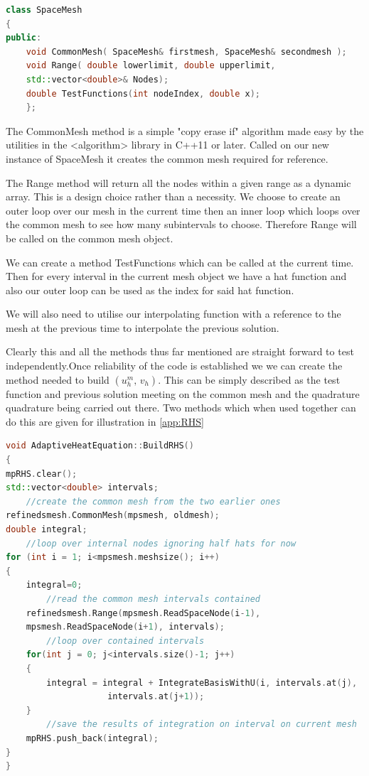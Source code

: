\documentclass{uonmathreport}
\theoremstyle{definition}
\theoremstyle{problem}
\theoremstyle{theorem}
\begin{document}
\begin{lstlisting}[language=C++]
class SpaceMesh
{
public:
    void CommonMesh( SpaceMesh& firstmesh, SpaceMesh& secondmesh );
    void Range( double lowerlimit, double upperlimit, 
    std::vector<double>& Nodes);
    double TestFunctions(int nodeIndex, double x);
    };
\end{lstlisting}

The CommonMesh method is a simple "copy erase if" algorithm made easy by the utilities in the <algorithm> library in C++11 or later. Called on our new instance of SpaceMesh it creates the common mesh required for reference. 

The Range method will return all the nodes within a given range as a dynamic array. This is a design choice rather than a necessity. We choose to create an outer loop over our mesh in the current time then an inner loop which loops over the common mesh to see how many subintervals to choose. Therefore Range will be called on the common mesh object.

We can create a method TestFunctions which can be called at the current time. Then for every interval in the current mesh object we have a hat function and also our outer loop can be used as the index for said hat function.

We will also need to utilise our interpolating function with a reference to the mesh at the previous time to interpolate the previous solution. 

Clearly this and all the methods thus far mentioned are straight forward to test independently.Once reliability of the code is established we we can create the method needed to build $(u_h^{m}, \, v_h )$. This can be simply described as the test function and previous solution meeting on the common mesh and the quadrature quadrature being carried out there. Two methods which when used together can do this are given for illustration in \ref{app:RHS}

\begin{lstlisting}[language=C++]
void AdaptiveHeatEquation::BuildRHS()
{
mpRHS.clear();
std::vector<double> intervals;
	//create the common mesh from the two earlier ones
refinedsmesh.CommonMesh(mpsmesh, oldmesh);
double integral;
	//loop over internal nodes ignoring half hats for now
for (int i = 1; i<mpsmesh.meshsize(); i++)
{
    integral=0;
    	//read the common mesh intervals contained 
    refinedsmesh.Range(mpsmesh.ReadSpaceNode(i-1), 
    mpsmesh.ReadSpaceNode(i+1), intervals);
		//loop over contained intervals
    for(int j = 0; j<intervals.size()-1; j++)
    {
        integral = integral + IntegrateBasisWithU(i, intervals.at(j),
                    intervals.at(j+1));
    }
    	//save the results of integration on interval on current mesh 
    mpRHS.push_back(integral);
}
}
\end{lstlisting} 
\end{document}
